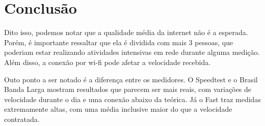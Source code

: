 \documentclass{report}
\begin{document}
\section{Conclusão}

Dito isso, podemos notar que a qualidade média da internet não é a esperada. Porém, é importante ressaltar que ela é dividida com mais 3 pessoas, que poderiam estar realizando atividades intensivas em rede durante alguma medição. Além disso, a conexão por wi-fi pode afetar a velocidade recebida.

Outo ponto a ser notado é a diferença entre os medidores. O Speedtest e o Brasil Banda Larga mostram resultados que parecem ser mais reais, com variações de velocidade durante o dia e uma conexão abaixo da teórica. Já o Fast traz medidas extremamente altas, com uma média inclusive maior do que a velocidade contratada.
\end{document}
